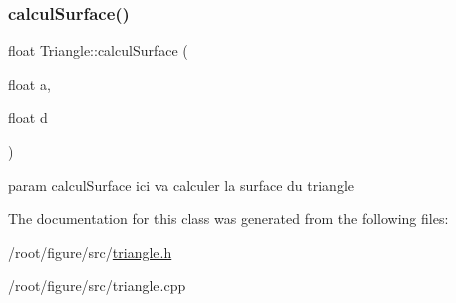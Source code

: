 \subsubsection{\texorpdfstring{calcul\+Surface()}{calculSurface()}}
{\footnotesize\ttfamily float Triangle\+::calcul\+Surface (\begin{DoxyParamCaption}\item[{float}]{a,  }\item[{float}]{d }\end{DoxyParamCaption})}

param calcul\+Surface ici va calculer la surface du triangle 

The documentation for this class was generated from the following files\+:\begin{DoxyCompactItemize}
\item 
/root/figure/src/\hyperlink{triangle_8h}{triangle.\+h}\item 
/root/figure/src/triangle.\+cpp\end{DoxyCompactItemize}
